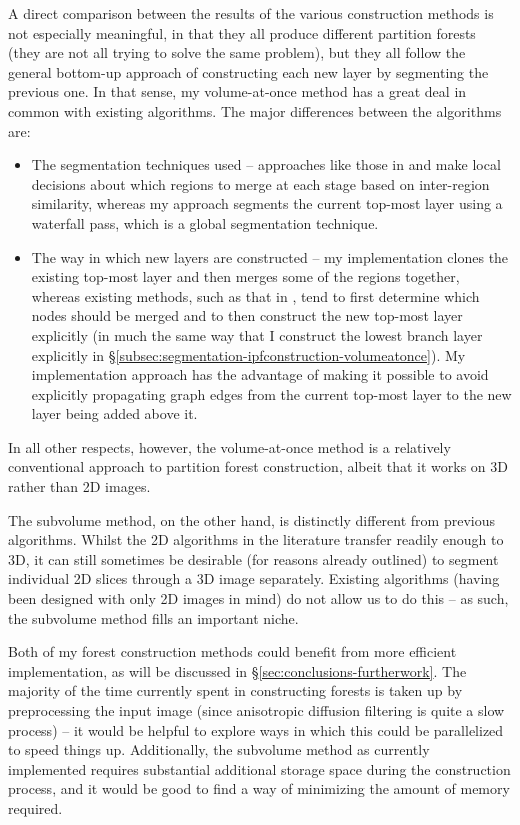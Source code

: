 A direct comparison between the results of the various construction methods is not especially meaningful, in that they all produce different partition forests (they are not all trying to solve the same problem), but they all follow the general bottom-up approach of constructing each new layer by segmenting the previous one. In that sense, my volume-at-once method has a great deal in common with existing algorithms. The major differences between the algorithms are:
%
\begin{itemize}

\item The segmentation techniques used -- approaches like those in \cite{yu02} and \cite{marfil07} make local decisions about which regions to merge at each stage based on inter-region similarity, whereas my approach segments the current top-most layer using a waterfall pass, which is a global segmentation technique.

\item The way in which new layers are constructed -- my implementation clones the existing top-most layer and then merges some of the regions together, whereas existing methods, such as that in \cite{yu02}, tend to first determine which nodes should be merged and to then construct the new top-most layer explicitly (in much the same way that I construct the lowest branch layer explicitly in \S\ref{subsec:segmentation-ipfconstruction-volumeatonce}). My implementation approach has the advantage of making it possible to avoid explicitly propagating graph edges from the current top-most layer to the new layer being added above it.

\end{itemize}
%
In all other respects, however, the volume-at-once method is a relatively conventional approach to partition forest construction, albeit that it works on 3D rather than 2D images.

The subvolume method, on the other hand, is distinctly different from previous algorithms. Whilst the 2D algorithms in the literature transfer readily enough to 3D, it can still sometimes be desirable (for reasons already outlined) to segment individual 2D slices through a 3D image separately. Existing algorithms (having been designed with only 2D images in mind) do not allow us to do this -- as such, the subvolume method fills an important niche.

Both of my forest construction methods could benefit from more efficient implementation, as will be discussed in \S\ref{sec:conclusions-furtherwork}. The majority of the time currently spent in constructing forests is taken up by preprocessing the input image (since anisotropic diffusion filtering is quite a slow process) -- it would be helpful to explore ways in which this could be parallelized to speed things up. Additionally, the subvolume method as currently implemented requires substantial additional storage space during the construction process, and it would be good to find a way of minimizing the amount of memory required.

